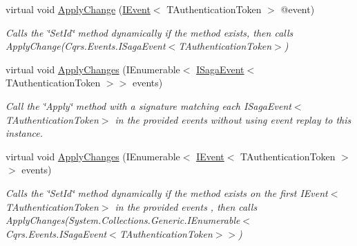 \begin{DoxyCompactItemize}
virtual void \hyperlink{classCqrs_1_1Domain_1_1Saga_a25462563492d834e297388e0648a57ac_a25462563492d834e297388e0648a57ac}{Apply\+Change} (\hyperlink{interfaceCqrs_1_1Events_1_1IEvent}{I\+Event}$<$ T\+Authentication\+Token $>$ @event)
\begin{DoxyCompactList}\small\item\em Calls the \char`\"{}\+Set\+Id\char`\"{} method dynamically if the method exists, then calls Apply\+Change(\+Cqrs.\+Events.\+I\+Saga\+Event$<$\+T\+Authentication\+Token$>$) \end{DoxyCompactList}\item 
virtual void \hyperlink{classCqrs_1_1Domain_1_1Saga_aa46571a6a68f8232955d3bac3be40c4a_aa46571a6a68f8232955d3bac3be40c4a}{Apply\+Changes} (I\+Enumerable$<$ \hyperlink{interfaceCqrs_1_1Events_1_1ISagaEvent}{I\+Saga\+Event}$<$ T\+Authentication\+Token $>$$>$ events)
\begin{DoxyCompactList}\small\item\em Call the \char`\"{}\+Apply\char`\"{} method with a signature matching each I\+Saga\+Event$<$\+T\+Authentication\+Token$>$ in the provided {\itshape events}  without using event replay to this instance. \end{DoxyCompactList}\item 
virtual void \hyperlink{classCqrs_1_1Domain_1_1Saga_a73de6a7e67618f9aa2eb1ef6d988d297_a73de6a7e67618f9aa2eb1ef6d988d297}{Apply\+Changes} (I\+Enumerable$<$ \hyperlink{interfaceCqrs_1_1Events_1_1IEvent}{I\+Event}$<$ T\+Authentication\+Token $>$$>$ events)
\begin{DoxyCompactList}\small\item\em Calls the \char`\"{}\+Set\+Id\char`\"{} method dynamically if the method exists on the first I\+Event$<$\+T\+Authentication\+Token$>$ in the provided {\itshape events} , then calls Apply\+Changes(\+System.\+Collections.\+Generic.\+I\+Enumerable$<$\+Cqrs.\+Events.\+I\+Saga\+Event$<$\+T\+Authentication\+Token$>$$>$) \end{DoxyCompactList}\end{DoxyCompactItemize}
